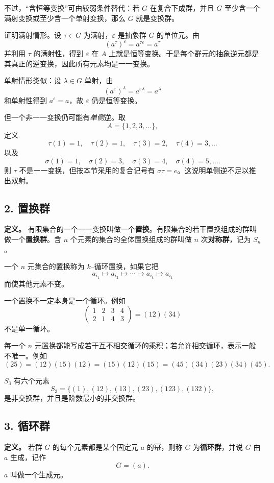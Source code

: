 不过，“含恒等变换”可由较弱条件替代：若 $G$ 在复合下成群，并且 $G$ 至少含一个满射变换或至少含一个单射变换，那么 $G$ 就是变换群。

证明满射情形。设 $\tau\in G$ 为满射，$\varepsilon$ 是抽象群 $G$ 的单位元。由
\[
(a^\tau)^\varepsilon=a^{\tau\varepsilon}=a^\tau
\]
并利用 $\tau$ 的满射性，得到 $\varepsilon$ 在 $A$ 上就是恒等变换。于是每个群元的抽象逆元都是其真正的逆变换，因此所有元素均是一一变换。

单射情形类似：设 $\lambda\in G$ 单射，由
\[
(a^\varepsilon)^\lambda=a^{\varepsilon\lambda}=a^\lambda
\]
和单射性得到 $a^\varepsilon=a$，故 $\varepsilon$ 仍是恒等变换。

但一个非一一变换仍可能有\emph{单侧}逆。取
\[
A=\{1,2,3,\ldots\},
\]
定义
\[
\tau(1)=1,\quad\tau(2)=1,\quad\tau(3)=2,\quad\tau(4)=3,\ldots
\]
以及
\[
\sigma(1)=1,\quad\sigma(2)=3,\quad\sigma(3)=4,\quad\sigma(4)=5,\ldots.
\]
则 $\tau$ 不是一一变换，但按本节采用的复合记号有 $\sigma\tau=e$。这说明单侧逆不足以推出双射。

\subsection*{2. 置换群}

\textbf{定义。} 有限集合的一个一一变换叫做一个\textbf{置换}。有限集合的若干置换组成的群叫做一个\textbf{置换群}。含 $n$ 个元素的集合的全体置换组成的群叫做 $n$ 次\textbf{对称群}，记为 $S_n$。

一个 $n$ 元集合的置换称为 $k$--循环置换，如果它把
\[
a_{i_1}\mapsto a_{i_2}\mapsto\cdots\mapsto a_{i_k}\mapsto a_{i_1}
\]
而使其他元素不变。

一个置换不一定本身是一个循环。例如
\[
\begin{pmatrix}
1&2&3&4\\
2&1&4&3
\end{pmatrix}
=(12)(34)
\]
不是单一循环。

每一个 $n$ 元置换都能写成若干互不相交循环的乘积；若允许相交循环，表示一般不唯一。例如
\[
(25)=(12)(15)(12)=(15)(12)(15)
=(45)(34)(23)(34)(45).
\]

$S_3$ 有六个元素
\[
S_3=\{(1),(12),(13),(23),(123),(132)\},
\]
是非交换群，并且是阶数最小的非交换群。

\subsection*{3. 循环群}

\textbf{定义。} 若群 $G$ 的每个元素都是某个固定元 $a$ 的幂，则称 $G$ 为\textbf{循环群}，并说 $G$ 由 $a$ 生成，记作
\[
G=(a).
\]
$a$ 叫做一个生成元。

